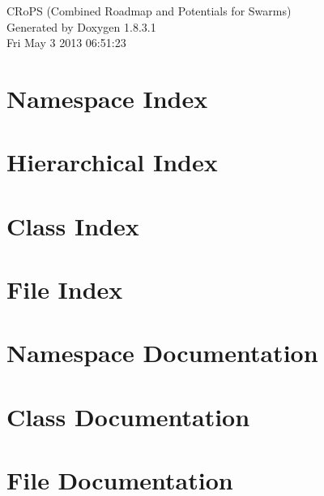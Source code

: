 \documentclass{book}
\begin{document}
\hypersetup{pageanchor=false,citecolor=blue}
\begin{titlepage}
\vspace*{7cm}
\begin{center}
{\Large C\-Ro\-P\-S (Combined Roadmap and Potentials for Swarms) }\\
\vspace*{1cm}
{\large Generated by Doxygen 1.8.3.1}\\
\vspace*{0.5cm}
{\small Fri May 3 2013 06:51:23}\\
\end{center}
\end{titlepage}
\clearemptydoublepage
{}
\tableofcontents
\clearemptydoublepage
{}
\hypersetup{pageanchor=true,citecolor=blue}
\chapter{Namespace Index}

\chapter{Hierarchical Index}

\chapter{Class Index}

\chapter{File Index}

\chapter{Namespace Documentation}











\chapter{Class Documentation}









\chapter{File Documentation}











\printindex
\end{document}
